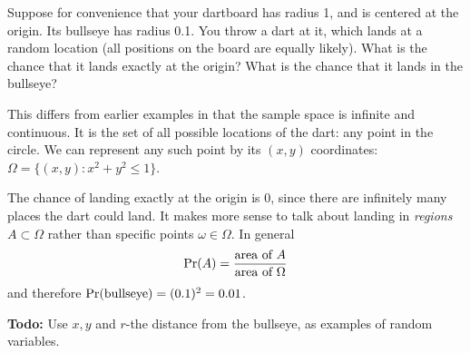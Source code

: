 Suppose for convenience that your dartboard has radius 1, and is
centered at the origin. Its bullseye has radius 0.1. You throw a dart
at it, which lands at a random location (all positions on the board
are equally likely). What is the chance that it lands exactly at the
origin? What is the chance that it lands in the bullseye?

This differs from earlier examples in that the sample space is infinite and continuous. It is the set of all possible locations of the dart: any point in the circle. We can represent any such point by its $(x,y)$ coordinates: $\Omega = \{(x,y): x^2 + y^2 \leq 1\}$.

The chance of landing exactly at the origin is 0, since there are infinitely many places the dart could land. It makes more sense to talk about landing in {\it regions} $A \subset \Omega$ rather than specific points $\omega \in \Omega$. In general
$$ \mbox{\rm Pr}(A) = \frac{\mbox{area of $A$}}{\mbox{area of $\Omega$}} $$
and therefore $\mbox{\rm Pr}(\mbox{bullseye}) = (0.1)^2 = 0.01$.

{\bf Todo:} Use $x,y$ and $r$-the distance from the bullseye, 
as examples of random variables.



